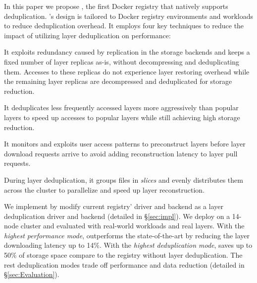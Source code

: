 In this paper we propose \sysname, the first Docker registry that natively
supports deduplication.
%
\sysname's design is tailored to Docker registry environments and workloads to
reduce deduplication overhead. 
It employs four key techniques to reduce
the impact of utilizing layer deduplication on performance: 
%
%
\begin{compactenumerate}
\item It exploits redundancy caused by replication in the storage backends and keeps a fixed
number of layer replicas as-is, without decompressing and deduplicating them.
%
Accesses to these replicas do not experience layer restoring overhead while
the remaining layer replicas are decompressed 
 and deduplicated for storage reduction.
%
\item It deduplicates less frequently accessed layers more
aggressively than popular layers to speed up accesses to popular
layers while still achieving high storage reduction.
%
\item It monitors and exploits user access patterns to preconstruct
layers before layer download requests arrive to avoid adding reconstruction
latency to layer pull requests.
%
\item During layer deduplication, it groups files in \emph{slices} and evenly
distributes them across the cluster to parallelize and speed up layer reconstruction.
%
\end{compactenumerate}



We implement \sysname by modify current registry' driver and backend as a 
layer deduplication driver and backend (detailed in \S\ref{sec:impl}).
We deploy \sysname
on a 14-node cluster and evaluated with real-world workloads and real layers.
With the \emph{highest performance mode},
\sysname outperforms the state-of-the-art by reducing the layer downloading latency up to 14\%.
With the \emph{highest deduplication mode},
\sysname saves up to 50\% of storage space compare to the registry without layer deduplication.
The rest deduplication modes trade off performance and data reduction (detailed in \S\ref{sec:Evaluation}).
%
